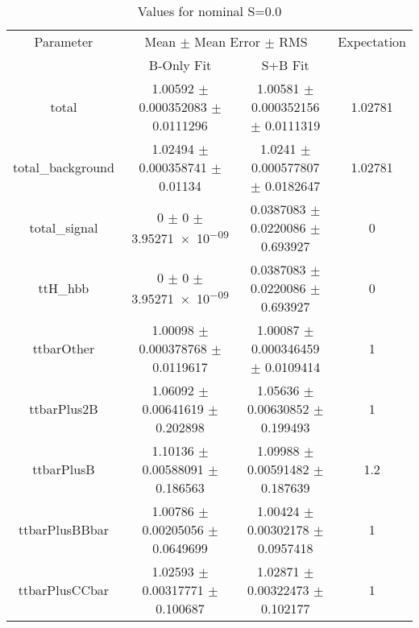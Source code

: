 \begin{table}
\centering
\caption{Values for nominal S=0.0}
\begin{tabular}{cccc}
\toprule
Parameter & \multicolumn{2}{c}{Mean $\pm$ Mean Error $\pm$ RMS} & Expectation\\
 & B-Only Fit & S+B Fit & \\
\midrule
total & \num{1.00592} $\pm$ \num{0.000352083} $\pm$ \num{0.0111296} & \num{1.00581} $\pm$ \num{0.000352156} $\pm$ \num{0.0111319} & \num{1.02781}\\
total\_background & \num{1.02494} $\pm$ \num{0.000358741} $\pm$ \num{0.01134} & \num{1.0241} $\pm$ \num{0.000577807} $\pm$ \num{0.0182647} & \num{1.02781}\\
total\_signal & \num{0} $\pm$ \num{0} $\pm$ \num{3.95271e-09} & \num{0.0387083} $\pm$ \num{0.0220086} $\pm$ \num{0.693927} & \num{0}\\
ttH\_hbb & \num{0} $\pm$ \num{0} $\pm$ \num{3.95271e-09} & \num{0.0387083} $\pm$ \num{0.0220086} $\pm$ \num{0.693927} & \num{0}\\
ttbarOther & \num{1.00098} $\pm$ \num{0.000378768} $\pm$ \num{0.0119617} & \num{1.00087} $\pm$ \num{0.000346459} $\pm$ \num{0.0109414} & \num{1}\\
ttbarPlus2B & \num{1.06092} $\pm$ \num{0.00641619} $\pm$ \num{0.202898} & \num{1.05636} $\pm$ \num{0.00630852} $\pm$ \num{0.199493} & \num{1}\\
ttbarPlusB & \num{1.10136} $\pm$ \num{0.00588091} $\pm$ \num{0.186563} & \num{1.09988} $\pm$ \num{0.00591482} $\pm$ \num{0.187639} & \num{1.2}\\
ttbarPlusBBbar & \num{1.00786} $\pm$ \num{0.00205056} $\pm$ \num{0.0649699} & \num{1.00424} $\pm$ \num{0.00302178} $\pm$ \num{0.0957418} & \num{1}\\
ttbarPlusCCbar & \num{1.02593} $\pm$ \num{0.00317771} $\pm$ \num{0.100687} & \num{1.02871} $\pm$ \num{0.00322473} $\pm$ \num{0.102177} & \num{1}\\
\bottomrule
\end{tabular}
\end{table}